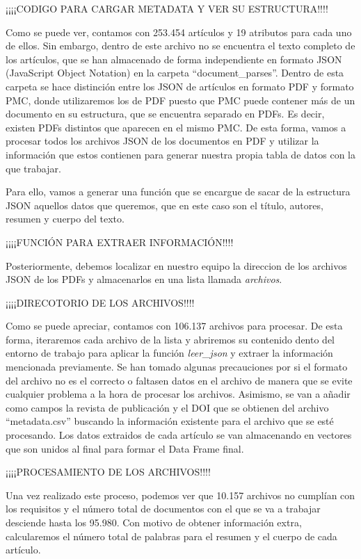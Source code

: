 \documentclass[10pt, a4paper]{article}
\begin{document}
¡¡¡¡CODIGO PARA CARGAR METADATA Y VER SU ESTRUCTURA!!!!

Como se puede ver, contamos con 253.454 artículos y 19 atributos para cada uno de ellos. Sin embargo, dentro de este archivo no se encuentra el texto completo de los artículos, que se han almacenado de forma independiente en formato JSON (JavaScript Object Notation) en la carpeta ``document\_parses''. Dentro de esta carpeta se hace distinción entre los JSON de artículos en formato PDF y formato PMC, donde utilizaremos los de PDF puesto que PMC puede contener más de un documento en su estructura, que se encuentra separado en PDFs. Es decir, existen PDFs distintos que aparecen en el mismo PMC. De esta forma, vamos a procesar todos los archivos JSON de los documentos en PDF y utilizar la información que estos contienen para generar nuestra propia tabla de datos con la que trabajar.

Para ello, vamos a generar una función que se encargue de sacar de la estructura JSON aquellos datos que queremos, que en este caso son el título, autores, resumen y cuerpo del texto.

¡¡¡¡FUNCIÓN PARA EXTRAER INFORMACIÓN!!!!

Posteriormente, debemos localizar en nuestro equipo la direccion de los archivos JSON de los PDFs y almacenarlos en una lista llamada \textit{archivos}.

¡¡¡¡DIRECOTORIO DE LOS ARCHIVOS!!!!

Como se puede apreciar, contamos con 106.137 archivos para procesar. De esta forma, iteraremos cada archivo de la lista y abriremos su contenido dento del entorno de trabajo para aplicar la función \textit{leer\_json} y extraer la información mencionada previamente. Se han tomado algunas precauciones por si el formato del archivo no es el correcto o faltasen datos en el archivo de manera que se evite cualquier problema a la hora de procesar los archivos. Asimismo, se van a añadir como campos la revista de publicación y el DOI que se obtienen del archivo ``metadata.csv'' buscando la información existente para el archivo que se esté procesando. Los datos extraidos de cada artículo se van almacenando en vectores que son unidos al final para formar el Data Frame final.

¡¡¡¡PROCESAMIENTO DE LOS ARCHIVOS!!!!

Una vez realizado este proceso, podemos ver que 10.157 archivos no cumplían con los requisitos y el número total de documentos con el que se va a trabajar desciende hasta los 95.980. Con motivo de obtener información extra, calcularemos el número total de palabras para el resumen y el cuerpo de cada artículo. 
\end{document}
